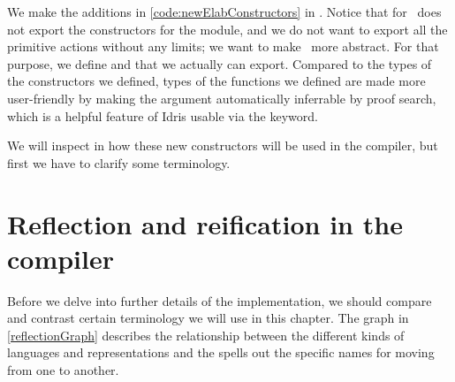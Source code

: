 We make the additions in \autoref{code:newElabConstructors} in \LRE.  Notice
that  for \Elab\ does not export the constructors for the module,
and we do not want to export all the primitive actions without any limits; we
want to make \Elab\ more abstract. For that purpose, we define
 and  that we actually can export.
Compared to the types of the constructors we defined, types of the functions we
defined are made more user-friendly by making the  argument
automatically inferrable by proof search, which is a helpful feature of Idris
usable via the  keyword.

We will inspect in \label{sec:primitiveEditorableImpl} how these new
constructors will be used in the compiler, but first we have to clarify some
terminology.

\newpage
\section{Reflection and reification in the compiler}

Before we delve into further details of the implementation, we should compare
and contrast certain terminology we will use in this chapter. The graph in
\autoref{reflectionGraph} describes the relationship between the different
kinds of languages and representations and the spells out the specific names
for moving from one to another.

